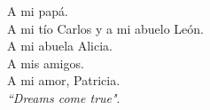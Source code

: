 \begin{center}
    \label{dedicatoria}
    A mi papá.\\
    A mi tío Carlos y a mi abuelo León.\\
    A mi abuela Alicia.\\
    A mis amigos.\\
    A mi amor, Patricia.\\
    \textit{``Dreams come true"}.
\end{center}
\pagebreak